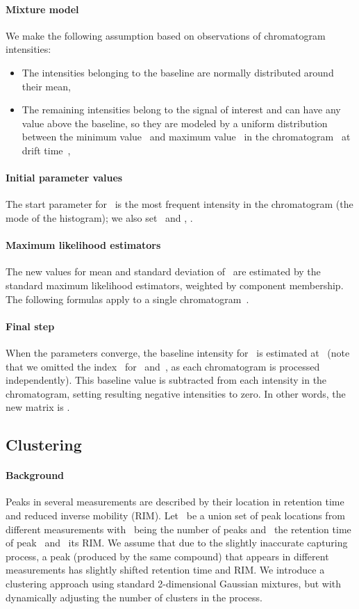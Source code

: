 \documentclass{article}
\begin{document}
\paragraph{Mixture model}
We make the following assumption based on observations of chromatogram intensities:
\begin{itemize}
\item The intensities belonging to the baseline are normally distributed around their mean,

\item The remaining intensities belong to the signal of interest and can have any value above the baseline, so they are modeled by a uniform distribution between the minimum value~ and maximum value~ in the chromatogram~ at drift time~,

\end{itemize}

\paragraph*{Initial parameter values}
The start parameter for~ is the most frequent intensity in the chromatogram (the mode of the histogram); we also set~ and , .

\paragraph*{Maximum likelihood estimators}
The new values for mean and standard deviation of~ are estimated by the standard maximum likelihood estimators, weighted by component membership.
The following formulas apply to a single chromatogram~.


\paragraph*{Final step}
When the parameters converge, the baseline intensity for~ is estimated at~ (note that we omitted the index~ for~ and~, as each chromatogram is processed independently).
This baseline value is subtracted from each intensity in the chromatogram, setting resulting negative intensities to zero.
In other words, the new matrix is .



\subsection{Clustering}
\label{sec:clustering}

\paragraph*{Background}
Peaks in several measurements are described by their location in retention time and reduced inverse mobility (RIM).
Let~ be a union set of peak locations from different measurements with~ being the number of peaks and~ the retention time of peak~ and~ its RIM.
We assume that due to the slightly inaccurate capturing process, a peak (produced by the same compound) that appears in different measurements has slightly shifted retention time and RIM.
We introduce a clustering approach using standard 2-dimensional Gaussian mixtures, but with dynamically adjusting the number of clusters in the process.
\end{document}
